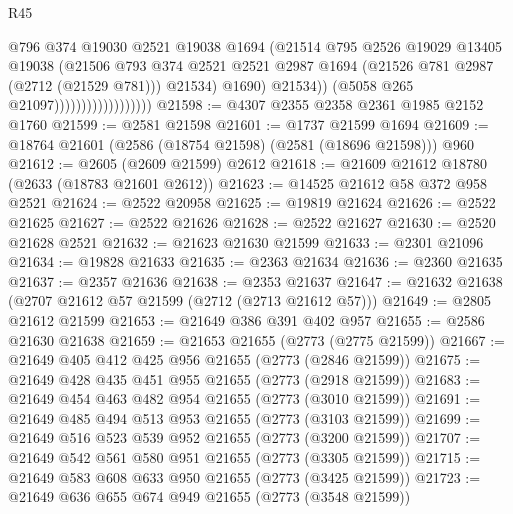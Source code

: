\begin{lexlean}{R45}
\begin{coremodule}
                                          @796
                                          @374
                                          @19030
                                          @2521
                                          @19038
                                          @1694
                                          (@21514
                                            @795
                                            @2526
                                            @19029
                                            @13405
                                            @19038
                                            (@21506
                                              @793
                                              @374
                                              @2521
                                              @2521
                                              @2987
                                              @1694
                                              (@21526 @781 @2987 (@2712 (@21529 @781)))
                                              @21534)
                                            @1690)
                                          @21534))
                                      (@5058 @265 @21097))))))))))))))))))
@21598 := @4307 @2355 @2358 @2361 @1985 @2152 @1760
@21599 := @2581 @21598
@21601 := @1737 @21599 @1694
@21609 := @18764 @21601 (@2586 (@18754 @21598) (@2581 (@18696 @21598))) @960
@21612 := @2605 (@2609 @21599) @2612
@21618 := @21609 @21612 @18780 (@2633 (@18783 @21601 @2612))
@21623 := @14525 @21612 @58 @372 @958 @2521
@21624 := @2522 @20958
@21625 := @19819 @21624
@21626 := @2522 @21625
@21627 := @2522 @21626
@21628 := @2522 @21627
@21630 := @2520 @21628 @2521
@21632 := @21623 @21630 @21599
@21633 := @2301 @21096
@21634 := @19828 @21633
@21635 := @2363 @21634
@21636 := @2360 @21635
@21637 := @2357 @21636
@21638 := @2353 @21637
@21647 := @21632 @21638 (@2707 @21612 @57 @21599 (@2712 (@2713 @21612 @57)))
@21649 := @2805 @21612 @21599
@21653 := @21649 @386 @391 @402 @957
@21655 := @2586 @21630 @21638
@21659 := @21653 @21655 (@2773 (@2775 @21599))
@21667 := @21649 @405 @412 @425 @956 @21655 (@2773 (@2846 @21599))
@21675 := @21649 @428 @435 @451 @955 @21655 (@2773 (@2918 @21599))
@21683 := @21649 @454 @463 @482 @954 @21655 (@2773 (@3010 @21599))
@21691 := @21649 @485 @494 @513 @953 @21655 (@2773 (@3103 @21599))
@21699 := @21649 @516 @523 @539 @952 @21655 (@2773 (@3200 @21599))
@21707 := @21649 @542 @561 @580 @951 @21655 (@2773 (@3305 @21599))
@21715 := @21649 @583 @608 @633 @950 @21655 (@2773 (@3425 @21599))
@21723 := @21649 @636 @655 @674 @949 @21655 (@2773 (@3548 @21599))

\end{coremodule}
\end{lexlean}
